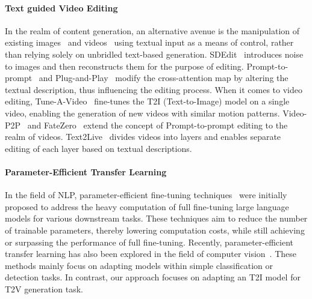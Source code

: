 \paragraph{Text guided Video Editing}
In the realm of content generation, an alternative avenue is the manipulation of existing images~\cite{brooks2023instructpix2pix, hertz2022prompt2prompt, meng2021sdedit, tumanyan2023plug} and videos~\cite{tuneavideo,bar2022text2live, gen1, liu2023video, qi2023fatezero, shin2023edit,zhang2023towards, yang2023rerender} using textual input as a means of control, rather than relying solely on unbridled text-based generation. SDEdit~\cite{meng2021sdedit} introduces noise to images and then reconstructs them for the purpose of editing. Prompt-to-prompt~\cite{hertz2022prompt2prompt} and Plug-and-Play~\cite{tumanyan2023plug} modify the cross-attention map by altering the textual description, thus influencing the editing process. When it comes to video editing, Tune-A-Video~\cite{tuneavideo} fine-tunes the T2I (Text-to-Image) model on a single video, enabling the generation of new videos with similar motion patterns. Video-P2P~\cite{liu2023video} and FateZero~\cite{qi2023fatezero} extend the concept of Prompt-to-prompt editing to the realm of videos. Text2Live~\cite{bar2022text2live} divides videos into layers and enables separate editing of each layer based on textual descriptions.

\paragraph{Parameter-Efficient Transfer Learning}
In the field of NLP, parameter-efficient fine-tuning techniques~\cite{houlsby2019parameter, hu2021lora, lester2021power, li2021prefix, he2021towards,zaken2021bitfit, sung2021training} were initially proposed to address the heavy computation of full fine-tuning large language models for various downstream tasks. These techniques aim to reduce the number of trainable parameters, thereby lowering computation costs, while still achieving or surpassing the performance of full fine-tuning.
Recently, parameter-efficient transfer learning has also been explored in the field of computer vision~\cite{jia2022visual, bahng2022exploring, chen2022adaptformer, jie2022convolutional, gao2022visual, yang2023aim, st-adapter, multimodaladapter,ssl3d, mpcn}. These methods mainly focus on adapting models within simple classification or detection tasks. In contrast, our approach focuses on adapting an T2I model for T2V generation task.

